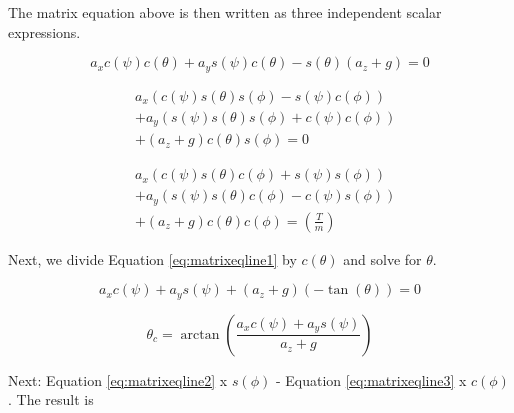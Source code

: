 The matrix equation above is then written as three independent scalar expressions.




\begin{equation}
    \label{eq:matrixeqline1}
    a_x c(\psi) c(\theta) + a_y s(\psi) c(\theta) - s(\theta)( a_z + g ) = 0
\end{equation}

\begin{equation}
    \label{eq:matrixeqline2}
    \begin{split}
    & a_x (c(\psi) s(\theta) s(\phi) - s(\psi) c(\phi))\\
    &+ a_y (s(\psi) s(\theta) s(\phi) + c(\psi) c(\phi))\\
    &+ ( a_z + g )c(\theta) s(\phi) = 0
\end{split}
\end{equation}

\begin{equation}
    \label{eq:matrixeqline3}
    \begin{split}
    & a_x (c(\psi) s(\theta) c(\phi) + s(\psi) s(\phi))\\
    &+ a_y (s(\psi) s(\theta) c(\phi) - c(\psi) s(\phi))\\
    &+ ( a_z + g )c(\theta) c(\phi) = (\frac{T}{m})
\end{split}
\end{equation}


Next, we divide Equation \eqref{eq:matrixeqline1} by $c(\theta)$ and solve for $\theta$.

\begin{equation}
a_x c(\psi) + a_y s(\psi) + (a_z+g)(-\tan(\theta)) = 0
\end{equation}


\begin{equation}
    \label{eq:thetac}
    \theta_c = \arctan( \frac{a_x c(\psi) + a_y s(\psi)}{a_z+g} )
\end{equation}


Next: Equation \eqref{eq:matrixeqline2} x $ s(\phi) $ - Equation \eqref{eq:matrixeqline3} x $ c(\phi) $. The result is

